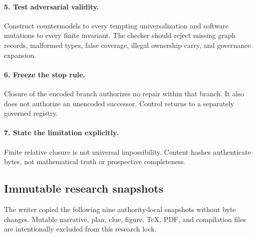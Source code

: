 \paragraph{5. Test adversarial validity.}
Construct countermodels to every tempting universalization and software
mutations to every finite invariant.  The checker should reject missing graph
records, malformed types, false coverage, illegal ownership carry, and
governance expansion.

\paragraph{6. Freeze the stop rule.}
Closure of the encoded branch authorizes no repair within that branch.  It also
does not authorize an unencoded successor.  Control returns to a separately
governed registry.

\paragraph{7. State the limitation explicitly.}
Finite relative closure is not universal impossibility.  Content hashes
authenticate bytes, not mathematical truth or prospective completeness.

\subsection{Immutable research snapshots}

The writer copied the following nine authority-local snapshots without byte
changes.  Mutable narrative, plan, clue, figure, TeX, PDF, and compilation files
are intentionally excluded from this research lock.

